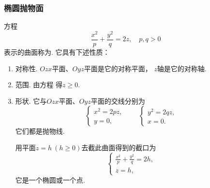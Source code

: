 \subsubsection{椭圆抛物面}
方程\begin{equation}\label{equation:解析几何.椭圆抛物面的一般方程}
	\frac{x^2}{p}+\frac{y^2}{q}=2z,
	\quad p,q>0
\end{equation}
表示的曲面称为.
它具有下述性质：
\begin{enumerate}
	\item 对称性.
	\(Ozx\)平面、\(Oyz\)平面是它的对称平面，
	\(z\)轴是它的对称轴.

	\item 范围.
	由方程  得\(z \geq 0\).

	\item 形状.
	它与\(Ozx\)平面、\(Oyz\)平面的交线分别为\[
		\left\{ \begin{array}{l}
			x^2 = 2pz, \\
			y = 0,
		\end{array} \right.
		\qquad
		\left\{ \begin{array}{l}
			y^2 = 2qz, \\
			x = 0.
		\end{array} \right.
	\]
	它们都是抛物线.

	用平面\(z = h\ (h\geq0)\)去截此曲面得到的截口为\[
		\left\{ \begin{array}{l}
			\frac{x^2}{p} + \frac{y^2}{q} = 2h, \\
			z = h,
		\end{array} \right.
	\]
	它是一个椭圆或一个点.
\end{enumerate}

